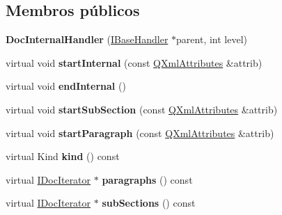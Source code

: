 \subsection*{Membros públicos}
\begin{DoxyCompactItemize}
\item 
\hypertarget{class_doc_internal_handler_a4fd6c20eba27af8b1124eaddccc371f2}{{\bfseries Doc\-Internal\-Handler} (\hyperlink{class_i_base_handler}{I\-Base\-Handler} $\ast$parent, int level)}\label{class_doc_internal_handler_a4fd6c20eba27af8b1124eaddccc371f2}

\item 
\hypertarget{class_doc_internal_handler_ae252c8def30c9ccd26a72227211e309e}{virtual void {\bfseries start\-Internal} (const \hyperlink{class_q_xml_attributes}{Q\-Xml\-Attributes} \&attrib)}\label{class_doc_internal_handler_ae252c8def30c9ccd26a72227211e309e}

\item 
\hypertarget{class_doc_internal_handler_a4920198df41054e7526e61a6f5c8d10e}{virtual void {\bfseries end\-Internal} ()}\label{class_doc_internal_handler_a4920198df41054e7526e61a6f5c8d10e}

\item 
\hypertarget{class_doc_internal_handler_a5a04b885f45ed0122118e983edbf83ca}{virtual void {\bfseries start\-Sub\-Section} (const \hyperlink{class_q_xml_attributes}{Q\-Xml\-Attributes} \&attrib)}\label{class_doc_internal_handler_a5a04b885f45ed0122118e983edbf83ca}

\item 
\hypertarget{class_doc_internal_handler_abb7f955561480002949ada58092c1964}{virtual void {\bfseries start\-Paragraph} (const \hyperlink{class_q_xml_attributes}{Q\-Xml\-Attributes} \&attrib)}\label{class_doc_internal_handler_abb7f955561480002949ada58092c1964}

\item 
\hypertarget{class_doc_internal_handler_af8e62c8a81ddf2283205cc8955de50eb}{virtual Kind {\bfseries kind} () const }\label{class_doc_internal_handler_af8e62c8a81ddf2283205cc8955de50eb}

\item 
\hypertarget{class_doc_internal_handler_ad870cd6bfbcecf45d470752b1ff5ff42}{virtual \hyperlink{class_i_doc_iterator}{I\-Doc\-Iterator} $\ast$ {\bfseries paragraphs} () const }\label{class_doc_internal_handler_ad870cd6bfbcecf45d470752b1ff5ff42}

\item 
\hypertarget{class_doc_internal_handler_a165e4fe99efe201a9372b5eccc78bacd}{virtual \hyperlink{class_i_doc_iterator}{I\-Doc\-Iterator} $\ast$ {\bfseries sub\-Sections} () const }\label{class_doc_internal_handler_a165e4fe99efe201a9372b5eccc78bacd}

\end{DoxyCompactItemize}
